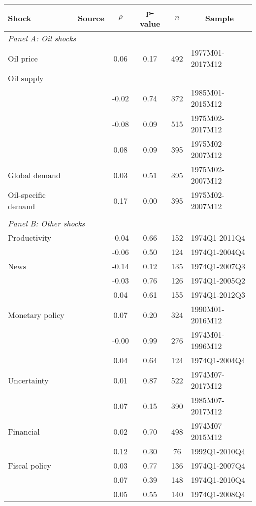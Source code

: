 \begin{tabular}{llcccl}\toprule\midrule  
Shock & \multicolumn{1}{c}{Source} & $\rho$ & p-value & $n$ & \multicolumn{1}{c}{Sample}    \\ \midrule  
 \multicolumn{6}{l}{\textit{Panel A: Oil shocks}} \\  
 Oil price & \cite{hamilton2003oil} & 0.06 & 0.17 &   492 & 1977M01-2017M12 \\  
 Oil supply & \cite{kilian2008exogenous} &  &  &   &   \\  
  & \cite{caldara2018oil} & -0.02 & 0.74 &   372 & 1985M01-2015M12  \\  
  & \cite{baumeister2017structural} & -0.08 & 0.09 &   515 & 1975M02-2017M12  \\  
  & \cite{kilian2009not} & 0.08 & 0.09 &   395 & 1975M02-2007M12  \\  
 Global demand & \cite{kilian2009not} & 0.03 & 0.51 &   395 & 1975M02-2007M12  \\  
Oil-specific demand & \cite{kilian2009not} & 0.17 & 0.00 &   395 & 1975M02-2007M12  \\  
 \multicolumn{6}{l}{} \\  
 \multicolumn{6}{l}{\textit{Panel B: Other shocks}} \\  
Productivity & \cite{basu2006technology}  & -0.04 & 0.66 &   152 & 1974Q1-2011Q4  \\  
 & \cite{smets2007shocks} & -0.06 & 0.50 &   124 & 1974Q1-2004Q4  \\  
News & \cite{barsky2011news}  & -0.14 & 0.12 &   135 & 1974Q1-2007Q3  \\  
 & \cite{kurmann2013news} & -0.03 & 0.76 &   126 & 1974Q1-2005Q2  \\  
& \cite{beaudry2014news}  & 0.04 & 0.61 &   155 & 1974Q1-2012Q3  \\  
Monetary policy & \cite{gertler2015monetary} & 0.07 & 0.20 &   324 & 1990M01-2016M12  \\  
 & \cite{romer2004new} & -0.00 & 0.99 &   276 & 1974M01-1996M12  \\  
 & \cite{smets2007shocks} & 0.04 & 0.64 &   124 & 1974Q1-2004Q4  \\  
 Uncertainty & \cite{bloom2009impact} & 0.01 & 0.87 &   522 & 1974M07-2017M12 \\  
  & \cite{baker2016measuring} & 0.07 & 0.15 &   390 & 1985M07-2017M12  \\  
 Financial  & \cite{gilchrist2012credit} & 0.02 & 0.70 &   498 & 1974M07-2015M12  \\  
 & \cite{bassett2014changes}  & 0.12 & 0.30 &    76 & 1992Q1-2010Q4  \\  
Fiscal policy & \cite{romer2010macroeconomic}  & 0.03 & 0.77 &   136 & 1974Q1-2007Q4  \\  
 & \cite{ramey2011identifying} & 0.07 & 0.39 &   148 & 1974Q1-2010Q4  \\  
& \cite{fisher2010using} & 0.05 & 0.55 &   140 & 1974Q1-2008Q4  \\  
\midrule\bottomrule 
\end{tabular}
